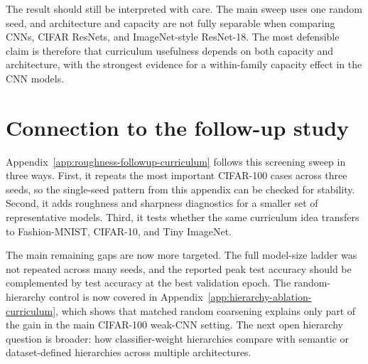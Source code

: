 The result should still be interpreted with care. The main sweep uses one random
seed, and architecture and capacity are not fully separable when comparing CNNs,
CIFAR ResNets, and ImageNet-style ResNet-18. The most defensible claim is
therefore that curriculum usefulness depends on both capacity and architecture,
with the strongest evidence for a within-family capacity effect in the CNN
models.

\section{Connection to the follow-up study}
\label{sec:cifar100-model-size-next-steps}

Appendix~\ref{app:roughness-followup-curriculum} follows this screening sweep in
three ways. First, it repeats the most important CIFAR-100 cases across three
seeds, so the single-seed pattern from this appendix can be checked for
stability. Second, it adds roughness and sharpness diagnostics for a smaller set
of representative models. Third, it tests whether the same curriculum idea
transfers to Fashion-MNIST, CIFAR-10, and Tiny ImageNet.

The main remaining gaps are now more targeted. The full model-size ladder was
not repeated across many seeds, and the reported peak test accuracy should be
complemented by test accuracy at the best validation epoch. The random-hierarchy
control is now covered in Appendix~\ref{app:hierarchy-ablation-curriculum},
which shows that matched random coarsening explains only part of the gain in the
main CIFAR-100 weak-CNN setting. The next open hierarchy question is broader:
how classifier-weight hierarchies compare with semantic or dataset-defined
hierarchies across multiple architectures.
